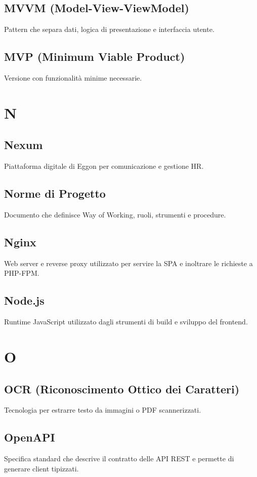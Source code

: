 \documentclass[a4paper,12pt]{article}
\begin{document}
\subsection{MVVM (Model-View-ViewModel)}
Pattern che separa dati, logica di presentazione e interfaccia utente.

\subsection{MVP (Minimum Viable Product)}
Versione con funzionalità minime necessarie.

\section{N}
\subsection{Nexum}
Piattaforma digitale di Eggon per comunicazione e gestione HR.

\subsection{Norme di Progetto}
Documento che definisce Way of Working, ruoli, strumenti e procedure.

\subsection{Nginx}
Web server e reverse proxy utilizzato per servire la SPA e inoltrare le richieste a PHP-FPM.

\subsection{Node.js}
Runtime JavaScript utilizzato dagli strumenti di build e sviluppo del frontend.

\section{O}
\subsection{OCR (Riconoscimento Ottico dei Caratteri)}
Tecnologia per estrarre testo da immagini o PDF scannerizzati.

\subsection{OpenAPI}
Specifica standard che descrive il contratto delle API REST e permette di generare client tipizzati.
\end{document}

